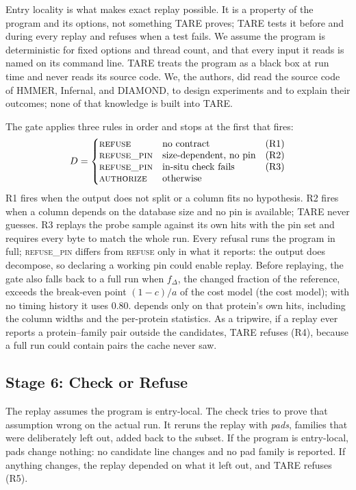 \documentclass[letterpaper,twocolumn,10pt]{article}
\theoremstyle{definition}
\theoremstyle{plain}
\newcommand{\sys}{TARE\xspace}
\newcommand{\dec}[1]{\textsc{#1}}
\begin{document}
Entry locality is what makes exact replay possible. It is a property of the program and its options, not something
\sys proves; \sys tests it before and during every replay and refuses when a test fails. We assume the program is
deterministic for fixed options and thread count, and that every input it reads is named on its command line.
\sys treats the program as a black box at run time and never reads its source code. We, the authors, did read the
source code of HMMER, Infernal, and DIAMOND, to design experiments and to explain their outcomes; none of that knowledge
is built into \sys.

The gate applies three rules in order and stops at the first that fires:
\begin{equation}
D = \left\{\begin{array}{@{}lll@{}}
\dec{refuse} & \text{no contract} & \text{(R1)}\\
\dec{refuse\_pin} & \text{size-dependent, no pin} & \text{(R2)}\\
\dec{refuse\_pin} & \text{in-situ check fails} & \text{(R3)}\\
\dec{authorize} & \text{otherwise} &
\end{array}\right.
\label{eq:gate}
\end{equation}
R1 fires when the output does not split or a column fits no hypothesis. R2 fires when a column depends on the database
size and no pin is available; \sys never guesses. R3 replays the probe sample against its own hits with the pin set and
requires every byte to match the whole run. Every refusal runs the program in full; \dec{refuse\_pin} differs from
\dec{refuse} only in what it reports: the output does decompose, so declaring a working pin could enable replay. Before replaying, the gate also falls back
to a full run when $f_\Delta$, the changed fraction of the reference, exceeds the break\nobreakdash-even point $(1-c)/a$ of the
cost model (the cost model); with no timing history it uses 0.80.
depends only on that protein's own hits, including the column widths and the per\nobreakdash-protein statistics. As a tripwire, if
a replay ever reports a protein--family pair outside the candidates, \sys refuses (R4), because a full run could
contain pairs the cache never saw.
\subsection{Stage 6: Check or Refuse}
\label{sec:check}

The replay assumes the program is entry\nobreakdash-local. The check tries to prove that assumption wrong on the actual run. It
reruns the replay with \textit{pads}, families that were deliberately left out, added back to the subset. If the
program is entry\nobreakdash-local, pads change nothing: no candidate line changes and no pad family is reported. If anything
changes, the replay depended on what it left out, and \sys refuses (R5).
\end{document}
